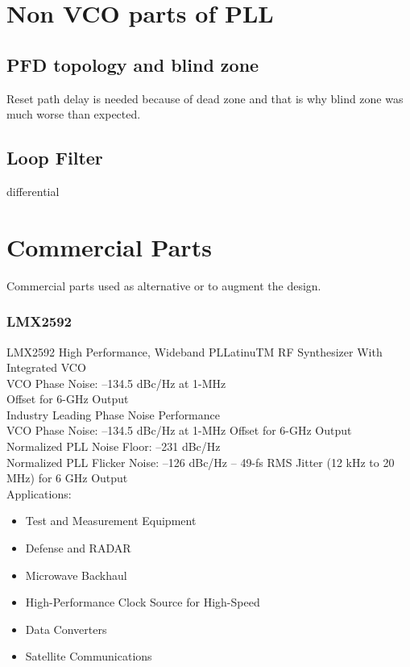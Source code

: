 \documentclass{article}
\begin{document}
\section{Non VCO parts of PLL}


\subsection{PFD topology and blind zone } %


Reset path delay is needed because of dead zone and that is why blind zone was much worse than expected. %
\\

\subsection{Loop Filter}

differential

\section{Commercial Parts}

Commercial parts used as alternative or to augment the design.

\subsubsection*{LMX2592}
LMX2592 High Performance, Wideband PLLatinuTM RF Synthesizer With Integrated VCO
\\
VCO Phase Noise: –134.5 dBc/Hz at 1-MHz
\\
Offset for 6-GHz Output
\\
Industry Leading Phase Noise Performance 
\\
VCO Phase Noise: –134.5 dBc/Hz at 1-MHz Offset for 6-GHz Output
\\
Normalized PLL Noise Floor: –231 dBc/Hz 
\\
Normalized PLL Flicker Noise: –126 dBc/Hz – 49-\unit[]{\fs} RMS Jitter (12 kHz to 20 MHz) for 6 GHz Output
\\
Applications: 
\begin{itemize}
	\item Test and Measurement Equipment
	\item Defense and RADAR
	\item Microwave Backhaul
	\item High-Performance Clock Source for High-Speed
	\item Data Converters
	\item Satellite Communications
\end{itemize}
\end{document}
